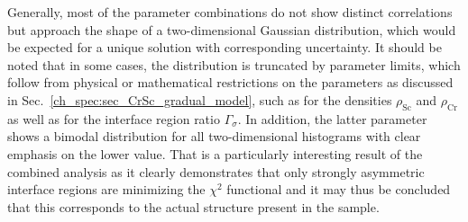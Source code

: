Generally, most of the parameter combinations do not show distinct correlations but approach the shape of a two-dimensional Gaussian distribution, which would be expected for a unique solution with corresponding uncertainty. It should be noted that in some cases, the distribution is truncated by parameter limits, which follow from physical or mathematical restrictions on the parameters as discussed in Sec.~\ref{ch_spec:sec_CrSc_gradual_model}, such as for the densities $\rho_\text{Sc}$ and $\rho_\text{Cr}$ as well as for the interface region ratio $\Gamma_\sigma$. In addition, the latter parameter shows a bimodal distribution for all two-dimensional histograms with clear emphasis on the lower value. That is a particularly interesting result of the combined analysis as it clearly demonstrates that only strongly asymmetric interface regions are minimizing the $\chi^2$ functional and it may thus be concluded that this corresponds to the actual structure present in the sample.

